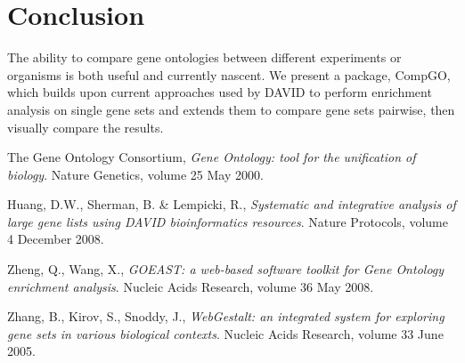 \documentclass[11pt, oneside]{article}
\begin{document}
\section*{Conclusion}
The ability to compare gene ontologies between different experiments or organisms is both useful and currently nascent. We present a package, CompGO, which builds upon current approaches used by DAVID to perform enrichment analysis on single gene sets and extends them to compare gene sets pairwise, then visually compare the results. 


\begin{thebibliography}{}

	The Gene Ontology Consortium, 
	\emph{Gene Ontology: tool for the unification of biology}.
	Nature Genetics, volume 25
	May 2000.

	Huang, D.W., Sherman, B. \& Lempicki, R.,
	\emph{Systematic and integrative analysis of large gene lists using DAVID bioinformatics resources}.
	Nature Protocols, volume 4
	December 2008.

	Zheng, Q., Wang, X.,
	\emph{GOEAST: a web-based software toolkit for Gene Ontology enrichment analysis}.
	Nucleic Acids Research, volume 36
	May 2008.

	Zhang, B., Kirov, S., Snoddy, J.,
	\emph{WebGestalt: an integrated system for exploring gene sets in various biological contexts}.
	Nucleic Acids Research, volume 33
	June 2005.

\end{thebibliography}
\end{document}
